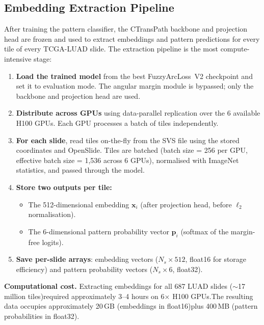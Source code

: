 \subsection{Embedding Extraction Pipeline}
\label{sec:impl:embedding_extraction}

After training the pattern classifier, the CTransPath backbone and
projection head are frozen and used to extract embeddings and pattern
predictions for every tile of every TCGA-LUAD slide.
The extraction pipeline is the most
compute-intensive stage:

\begin{enumerate}
    \item \textbf{Load the trained model} from the best FuzzyArcLoss~V2
    checkpoint and set it to evaluation mode. The angular margin module is bypassed;
    only the backbone and projection head are used.

    \item \textbf{Distribute across GPUs} using data-parallel replication
    over the 6 available H100 GPUs. Each GPU processes a batch of tiles
    independently.

    \item \textbf{For each slide}, read tiles on-the-fly from the SVS file
    using the stored coordinates and OpenSlide. Tiles are batched
    (batch size = 256 per GPU, effective batch size = 1{,}536 across 6 GPUs),
    normalised with ImageNet statistics, and passed through the model.

    \item \textbf{Store two outputs per tile:}
    \begin{itemize}
        \item The 512-dimensional embedding $\mathbf{x}_i$ (after projection
        head, before $\ell_2$ normalisation).
        \item The 6-dimensional pattern probability vector $\mathbf{p}_i$
        (softmax of the margin-free logits).
    \end{itemize}

    \item \textbf{Save per-slide arrays}: embedding vectors
    ($N_s \times 512$, float16 for storage efficiency) and
    pattern probability vectors ($N_s \times 6$, float32).
\end{enumerate}

\textbf{Computational cost.}
Extracting embeddings for all 687 LUAD slides ($\sim$17 million tiles)required approximately 3--4 hours on 6$\times$ H100 GPUs.The resulting data occupies approximately 20\,GB (embeddings in float16)plus 400\,MB (pattern probabilities in float32).

